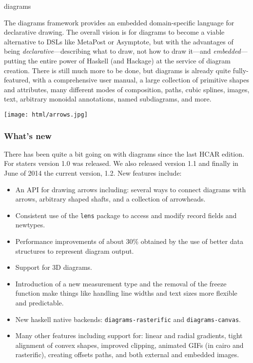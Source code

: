 \begin{hcarentry}[updated]{diagrams}
\makeheader

The diagrams framework provides an embedded domain-specific language
for declarative drawing.  The overall vision is for diagrams to become
a viable alternative to DSLs like MetaPost or Asymptote, but with the
advantages of being \emph{declarative}---describing what to draw, not
how to draw it---and \emph{embedded}---putting the entire power of
Haskell (and Hackage) at the service of diagram creation.  There is
still much more to be done, but diagrams is already quite
fully-featured, with a comprehensive user manual, a large collection
of primitive shapes and attributes, many different modes of
composition, paths, cubic splines, images, text, arbitrary monoidal
annotations, named subdiagrams, and more.

\begin{center}
\texttt{[image: html/arrows.jpg]}
\end{center}

\subsubsection*{What's new}

There has been quite a bit going on with diagrams since the last
HCAR edition. For staters version 1.0 was released.
We also released version 1.1 and finally in June of 2014
the current version, 1.2.
New features include:
\begin{itemize}
\item An API for drawing arrows including: several ways to connect diagrams
  with arrows, arbitrary shaped shafts, and a collection of arrowheads.
\item Consistent use of the \texttt{lens} package to access and modify 
  record fields and newtypes.
\item Performance improvements of about 30\% obtained by the use
  of better data structures to represent diagram output.
\item Support for 3D diagrams.
\item Introduction of a new measurement type and the removal of the
  freeze function make things like handling line widths and text sizes
  more flexible and predictable.
\item New haskell native backends: \texttt{diagrams-rasterific} and
  \texttt{diagrams-canvas}. 
\item Many other features including support for: linear and radial gradients, tight alignment of convex
  shapes, improved clipping, animated GIFs (in cairo and rasterific), creating offsets paths,
  and both external and embedded images.
\end{itemize}


\end{hcarentry}
